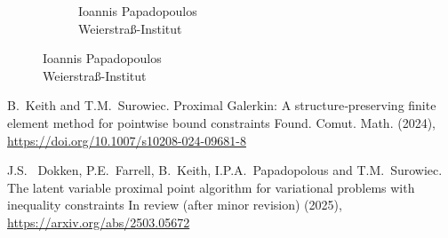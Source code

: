 \documentclass[aspectratio=169,xcolor=dvipsnames,11pt]{beamer}
\begin{document}
\begin{frame}
\begin{figure}
\begin{subfigure}[b]{3.2cm}
    \caption{Ioannis Papadopoulos\\ Weierstra\ss-Institut}
  \end{subfigure}
\hspace{7em}	
\end{figure}\vspace{-4ex}
{\tiny
\begin{thebibliography}{1}

{\sc B.~Keith and T.M.~Surowiec.}
\newblock Proximal Galerkin: A structure‐preserving finite element method for pointwise bound constraints
\newblock Found. Comut. Math. (2024), \url{https://doi.org/10.1007/s10208-024-09681-8}

{\sc J.S.~ Dokken, P.E.~Farrell, B.~Keith, I.P.A.~Papadopolous and T.M.~Surowiec.}
\newblock The latent variable proximal point algorithm for variational problems with inequality constraints
\newblock In review (after minor revision) (2025), \url{https://arxiv.org/abs/2503.05672}
\end{thebibliography}
}
\end{frame}
\end{document}
